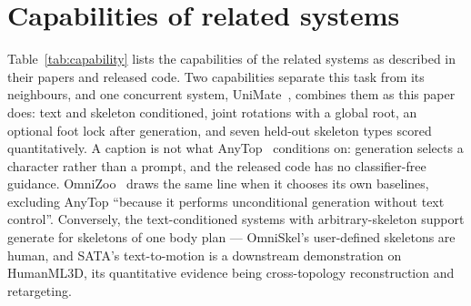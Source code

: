 \section{Capabilities of related systems}\label{app:capability}

Table~\ref{tab:capability} lists the capabilities of the related systems as described in their papers and
released code. Two capabilities separate this task from its neighbours, and one concurrent system,
UniMate~\citep{mou2026unimate}, combines them as this paper does: text and skeleton conditioned, joint rotations
with a global root, an optional foot lock after generation, and seven held-out skeleton types scored
quantitatively. A caption is not what
AnyTop~\citep{gat2025anytop} conditions on: generation
selects a character rather than a prompt, and the released code has no classifier-free guidance.
OmniZoo~\citep{chen2025omnizoo} draws the same line when it chooses its own baselines, excluding AnyTop
``because it performs unconditional generation without text control''. Conversely, the text-conditioned
systems with arbitrary-skeleton support generate for skeletons of one body plan --- OmniSkel's
\citep{liu2025omniskel} user-defined skeletons are human, and SATA's \citep{zhang2026sata} text-to-motion is a
downstream demonstration on HumanML3D, its quantitative evidence being cross-topology reconstruction and
retargeting.

